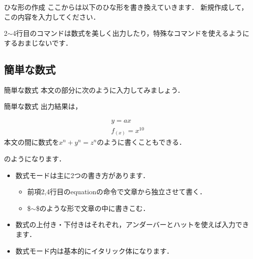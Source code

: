 \documentclass[slide,dvipdfmx]{beamer}
\begin{document}
\begin{frame}{ひな形の作成}
ここからは以下のひな形を書き換えていきます．
新規作成して，この内容を入力してください．

2$\sim$4行目のコマンドは数式を美しく出力したり，特殊なコマンドを使えるようにするおまじないです．
\end{frame}

\subsection{簡単な数式}
\begin{frame}{簡単な数式}
本文の部分に次のように入力してみましょう．

\end{frame}

\begin{frame}{簡単な数式}
出力結果は，
\begin{shadebox}
\begin{align}
y = ax \\
f_{(x)} = x^{10}
\end{align}
本文の間に数式を$x^n+y^n=z^n$のように書くこともできる．
\end{shadebox}
のようになります．
\begin{itemize}
\item 数式モードは主に2つの書き方があります．
\begin{itemize}
\item 前項2,4行目のequationの命令で文章から独立させて書く．
\item \$$\sim$\$のような形で文章の中に書きこむ．
\end{itemize}
\item 数式の上付き・下付きはそれぞれ，アンダーバーとハットを使えば入力できます．
\item 数式モード内は基本的にイタリック体になります．
\end{itemize}
\end{frame}
\end{document}
